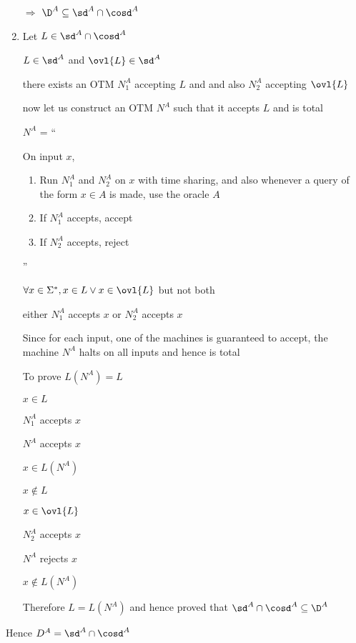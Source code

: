 \begin{enumerate}
    $\Rightarrow$
    $\D^A \subseteq \sd^A \cap \cosd^A$
    
    
\item

Let $L \in \sd^A \cap \cosd^A$

\imp
$L \in \sd^A$ and $\ovl{L} \in \sd^A$

\imp
there exists an OTM $N_1^A$ accepting $L$ and and also $N_2^A$ accepting $\ovl{L}$

now let us construct an OTM $N^A$ such that it accepts $L$ and is total

$N^A$ = 
``

On input $x$,
\begin{enumerate}
    \item Run $N_1^A$ and $N_2^A$ on $x$ with time sharing, and also whenever a query of the form $x \in A$ is made, use the oracle $A$
    \item If $N_1^A$ accepts, accept
    \item If $N_2^A$ accepts, reject
\end{enumerate}

''

$\forall x \in \Sigma^*, x \in L \lor x \in \ovl{L}$ but not both

\imp
either $N_1^A$ accepts $x$ or $N_2^A$ accepts $x$


Since for each input, one of the machines is guaranteed to accept, the machine $N^A$ halts on all inputs and hence is total

To prove $L(N^A) = L$

$x \in L$

\imp
$N_1^A$ accepts $x$

\imp
$N^A$ accepts $x$

\imp
$x \in L(N^A)$

$x \notin L$

\imp
$x \in \ovl{L}$

\imp
$N_2^A$ accepts $x$

\imp
$N^A$ rejects $x$

\imp
$x \notin L(N^A)$


Therefore $L = L(N^A)$ and hence proved that
$\sd^A \cap \cosd^A \subseteq \D^A$





\end{enumerate}


Hence $D^A = \sd^A \cap \cosd^A$





